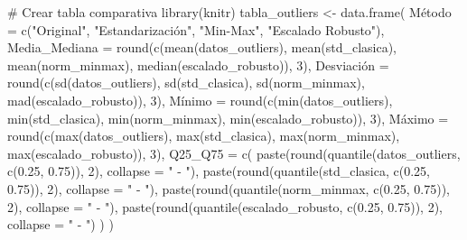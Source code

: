 \documentclass[
  letterpaper,
  DIV=11,
  numbers=noendperiod]{scrreprt}
\newenvironment{Shaded}{\begin{snugshade}}{\end{snugshade}}
\newcommand{\AttributeTok}[1]{\textcolor[rgb]{0.40,0.45,0.13}{#1}}
\newcommand{\CommentTok}[1]{\textcolor[rgb]{0.37,0.37,0.37}{#1}}
\newcommand{\DecValTok}[1]{\textcolor[rgb]{0.68,0.00,0.00}{#1}}
\newcommand{\FloatTok}[1]{\textcolor[rgb]{0.68,0.00,0.00}{#1}}
\newcommand{\FunctionTok}[1]{\textcolor[rgb]{0.28,0.35,0.67}{#1}}
\newcommand{\NormalTok}[1]{\textcolor[rgb]{0.00,0.23,0.31}{#1}}
\newcommand{\OtherTok}[1]{\textcolor[rgb]{0.00,0.23,0.31}{#1}}
\newcommand{\StringTok}[1]{\textcolor[rgb]{0.13,0.47,0.30}{#1}}
\begin{document}
\begin{tcolorbox}
\begin{Shaded}
\begin{Highlighting}[]
\CommentTok{\# Crear tabla comparativa}
\FunctionTok{library}\NormalTok{(knitr)}
\NormalTok{tabla\_outliers }\OtherTok{\textless{}{-}} \FunctionTok{data.frame}\NormalTok{(}
\NormalTok{  Método }\OtherTok{=} \FunctionTok{c}\NormalTok{(}\StringTok{"Original"}\NormalTok{, }\StringTok{"Estandarización"}\NormalTok{, }\StringTok{"Min{-}Max"}\NormalTok{, }\StringTok{"Escalado Robusto"}\NormalTok{),}
  \AttributeTok{Media\_Mediana =} \FunctionTok{round}\NormalTok{(}\FunctionTok{c}\NormalTok{(}\FunctionTok{mean}\NormalTok{(datos\_outliers), }\FunctionTok{mean}\NormalTok{(std\_clasica), }\FunctionTok{mean}\NormalTok{(norm\_minmax), }\FunctionTok{median}\NormalTok{(escalado\_robusto)), }\DecValTok{3}\NormalTok{),}
\NormalTok{  Desviación }\OtherTok{=} \FunctionTok{round}\NormalTok{(}\FunctionTok{c}\NormalTok{(}\FunctionTok{sd}\NormalTok{(datos\_outliers), }\FunctionTok{sd}\NormalTok{(std\_clasica), }\FunctionTok{sd}\NormalTok{(norm\_minmax), }\FunctionTok{mad}\NormalTok{(escalado\_robusto)), }\DecValTok{3}\NormalTok{),}
\NormalTok{  Mínimo }\OtherTok{=} \FunctionTok{round}\NormalTok{(}\FunctionTok{c}\NormalTok{(}\FunctionTok{min}\NormalTok{(datos\_outliers), }\FunctionTok{min}\NormalTok{(std\_clasica), }\FunctionTok{min}\NormalTok{(norm\_minmax), }\FunctionTok{min}\NormalTok{(escalado\_robusto)), }\DecValTok{3}\NormalTok{),}
\NormalTok{  Máximo }\OtherTok{=} \FunctionTok{round}\NormalTok{(}\FunctionTok{c}\NormalTok{(}\FunctionTok{max}\NormalTok{(datos\_outliers), }\FunctionTok{max}\NormalTok{(std\_clasica), }\FunctionTok{max}\NormalTok{(norm\_minmax), }\FunctionTok{max}\NormalTok{(escalado\_robusto)), }\DecValTok{3}\NormalTok{),}
  \AttributeTok{Q25\_Q75 =} \FunctionTok{c}\NormalTok{(}
    \FunctionTok{paste}\NormalTok{(}\FunctionTok{round}\NormalTok{(}\FunctionTok{quantile}\NormalTok{(datos\_outliers, }\FunctionTok{c}\NormalTok{(}\FloatTok{0.25}\NormalTok{, }\FloatTok{0.75}\NormalTok{)), }\DecValTok{2}\NormalTok{), }\AttributeTok{collapse =} \StringTok{" {-} "}\NormalTok{),}
    \FunctionTok{paste}\NormalTok{(}\FunctionTok{round}\NormalTok{(}\FunctionTok{quantile}\NormalTok{(std\_clasica, }\FunctionTok{c}\NormalTok{(}\FloatTok{0.25}\NormalTok{, }\FloatTok{0.75}\NormalTok{)), }\DecValTok{2}\NormalTok{), }\AttributeTok{collapse =} \StringTok{" {-} "}\NormalTok{),}
    \FunctionTok{paste}\NormalTok{(}\FunctionTok{round}\NormalTok{(}\FunctionTok{quantile}\NormalTok{(norm\_minmax, }\FunctionTok{c}\NormalTok{(}\FloatTok{0.25}\NormalTok{, }\FloatTok{0.75}\NormalTok{)), }\DecValTok{2}\NormalTok{), }\AttributeTok{collapse =} \StringTok{" {-} "}\NormalTok{),}
    \FunctionTok{paste}\NormalTok{(}\FunctionTok{round}\NormalTok{(}\FunctionTok{quantile}\NormalTok{(escalado\_robusto, }\FunctionTok{c}\NormalTok{(}\FloatTok{0.25}\NormalTok{, }\FloatTok{0.75}\NormalTok{)), }\DecValTok{2}\NormalTok{), }\AttributeTok{collapse =} \StringTok{" {-} "}\NormalTok{)}
\NormalTok{  )}
\NormalTok{)}


\end{Highlighting}
\end{Shaded}
\end{tcolorbox}
\end{document}
